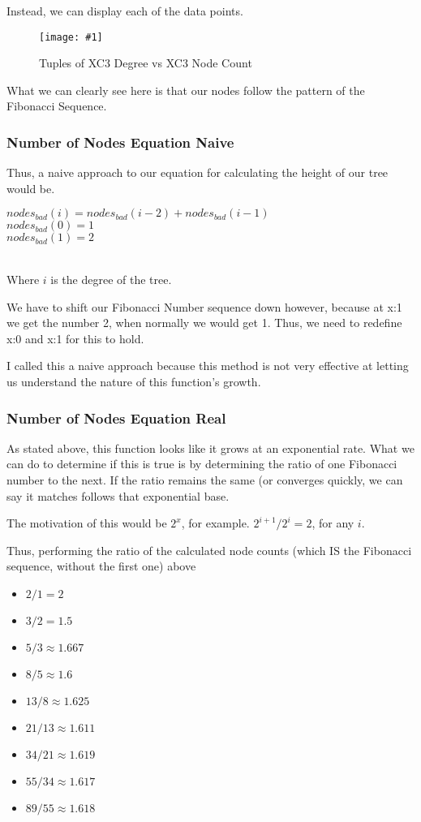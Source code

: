 \documentclass{article}
\newcommand{\figureInsetScaled}[3]
{
    \FloatBarrier{}
    \figureRaw{#1}{#2}{#3}
    \FloatBarrier{}
}
\newcommand{\figureRaw}[3]
{
    \begin{figure}[ht!]
        \centering
        \texttt{[image: \#1]}
        \caption{#2}
    \end{figure}
}
\begin{document}
Instead, we can display each of the data points.

\figureInsetScaled{images/experiment4/points.png}{Tuples of XC3 Degree vs XC3 Node Count}{0.65}

What we can clearly see here is that our nodes follow the pattern of the Fibonacci Sequence.


\subsubsection{Number of Nodes Equation Naive}

Thus, a naive approach to our equation for calculating the height of our tree would be.
\\
{
\Large
\begin{center}
    $nodes_{bad}(i) = nodes_{bad}(i-2) + nodes_{bad}(i-1)$\\
    $ $\\
    $nodes_{bad}(0) = 1$\\
    $nodes_{bad}(1) = 2$\\
    $ $
\end{center}
}
\\
Where $i$ is the degree of the tree.

We have to shift our Fibonacci Number sequence down however, because at x:1 we get the number 2, when normally we would get 1. Thus, we need to redefine x:0 and x:1 for this to hold.

I called this a naive approach because this method is not very effective at letting us understand the nature of this function's growth.

\subsubsection{Number of Nodes Equation Real}

As stated above, this function looks like it grows at an exponential rate. What we can do to determine if this is true is by determining the ratio of one Fibonacci number to the next. If the ratio remains the same (or converges quickly, we can say it matches follows that exponential base.

The motivation of this would be $2^x$, for example. $2^{i+1} / 2^{i} = 2$, for any $i$.

Thus, performing the ratio of the calculated node counts (which IS the Fibonacci sequence, without the first one) above

\begin{itemize}
    \item $2 / 1 = 2$
    \item $3 / 2 = 1.5$
    \item $5 / 3 \approx 1.667$
    \item $8 / 5 \approx 1.6$
    \item $13 / 8 \approx 1.625$
    \item $21 / 13 \approx 1.611$
    \item $34 / 21 \approx 1.619$
    \item $55 / 34 \approx 1.617$
    \item $89 / 55 \approx 1.618$
\end{itemize}
\end{document}
